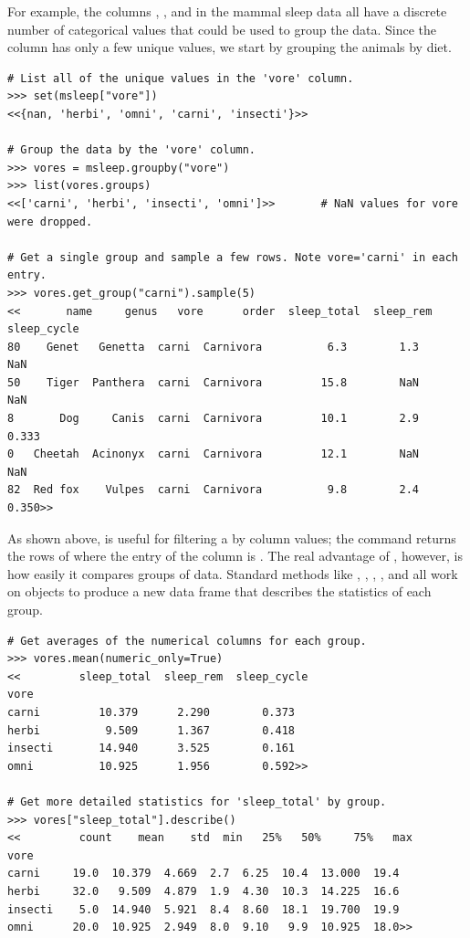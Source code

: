 For example, the columns , , and  in the mammal sleep data all have a discrete number of categorical values that could be used to group the data.
Since the  column has only a few unique values, we start by grouping the animals by diet.

\begin{lstlisting}
# List all of the unique values in the 'vore' column.
>>> set(msleep["vore"])
<<{nan, 'herbi', 'omni', 'carni', 'insecti'}>>

# Group the data by the 'vore' column.
>>> vores = msleep.groupby("vore")
>>> list(vores.groups)
<<['carni', 'herbi', 'insecti', 'omni']>>       # NaN values for vore were dropped.

# Get a single group and sample a few rows. Note vore='carni' in each entry.
>>> vores.get_group("carni").sample(5)
<<       name     genus   vore      order  sleep_total  sleep_rem  sleep_cycle
80    Genet   Genetta  carni  Carnivora          6.3        1.3          NaN
50    Tiger  Panthera  carni  Carnivora         15.8        NaN          NaN
8       Dog     Canis  carni  Carnivora         10.1        2.9        0.333
0   Cheetah  Acinonyx  carni  Carnivora         12.1        NaN          NaN
82  Red fox    Vulpes  carni  Carnivora          9.8        2.4        0.350>>
\end{lstlisting}

As shown above,  is useful for filtering a  by column values;
the command  returns the rows of  where the entry of the  column is .
The real advantage of , however, is how easily it compares groups of data.
Standard  methods like , , , , and  all work on  objects to produce a new data frame that describes the statistics of each group.

\begin{lstlisting}
# Get averages of the numerical columns for each group.
>>> vores.mean(numeric_only=True)
<<         sleep_total  sleep_rem  sleep_cycle
vore
carni         10.379      2.290        0.373
herbi          9.509      1.367        0.418
insecti       14.940      3.525        0.161
omni          10.925      1.956        0.592>>

# Get more detailed statistics for 'sleep_total' by group.
>>> vores["sleep_total"].describe()
<<         count    mean    std  min   25%   50%     75%   max
vore
carni     19.0  10.379  4.669  2.7  6.25  10.4  13.000  19.4
herbi     32.0   9.509  4.879  1.9  4.30  10.3  14.225  16.6
insecti    5.0  14.940  5.921  8.4  8.60  18.1  19.700  19.9
omni      20.0  10.925  2.949  8.0  9.10   9.9  10.925  18.0>>
\end{lstlisting}

